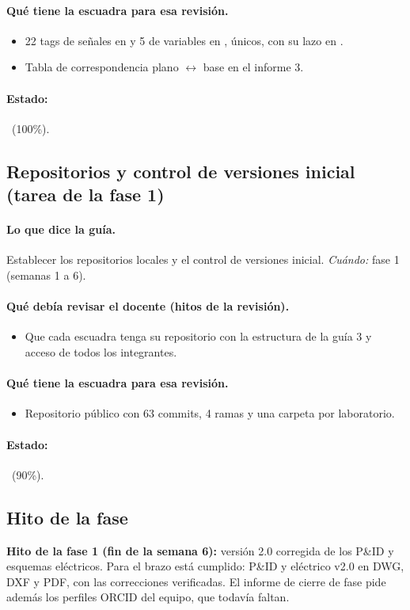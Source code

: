 \documentclass[a4paper,11pt]{article}
\begin{document}
\paragraph{Qué tiene la escuadra para esa revisión.}
\begin{itemize}
\item 22 tags de señales en  y 5 de variables en , únicos, con su lazo en .
\item Tabla de correspondencia plano $\leftrightarrow$ base en el informe 3.
\end{itemize}
\paragraph{Estado:} \cumple~(100\%).
\subsection{Repositorios y control de versiones inicial (tarea de la fase 1)}
\paragraph{Lo que dice la guía.} Establecer los repositorios locales y el control de versiones inicial. \textit{Cuándo:} fase 1 (semanas 1 a 6).
\paragraph{Qué debía revisar el docente (hitos de la revisión).}
\begin{itemize}
\item[$\square$] Que cada escuadra tenga su repositorio con la estructura de la guía 3 y acceso de todos los integrantes.
\end{itemize}
\paragraph{Qué tiene la escuadra para esa revisión.}
\begin{itemize}
\item Repositorio público con 63 commits, 4 ramas y una carpeta por laboratorio.
\end{itemize}
\paragraph{Estado:} \parcial~(90\%).
\subsection{Hito de la fase}
\textbf{Hito de la fase 1 (fin de la semana 6):} versión 2.0 corregida de los P\&ID y esquemas eléctricos. Para el brazo está cumplido: P\&ID y eléctrico v2.0 en DWG, DXF y PDF, con las correcciones verificadas. El informe de cierre de fase pide además los perfiles ORCID del equipo, que todavía faltan.
\end{document}
